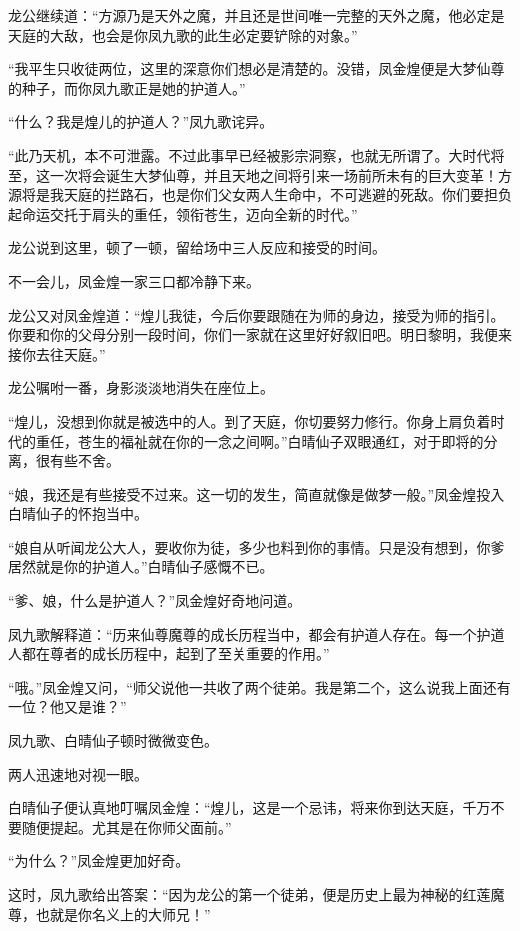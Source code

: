 \begin{this_body}
龙公继续道：“方源乃是天外之魔，并且还是世间唯一完整的天外之魔，他必定是天庭的大敌，也会是你凤九歌的此生必定要铲除的对象。”

“我平生只收徒两位，这里的深意你们想必是清楚的。没错，凤金煌便是大梦仙尊的种子，而你凤九歌正是她的护道人。”

“什么？我是煌儿的护道人？”凤九歌诧异。

“此乃天机，本不可泄露。不过此事早已经被影宗洞察，也就无所谓了。大时代将至，这一次将会诞生大梦仙尊，并且天地之间将引来一场前所未有的巨大变革！方源将是我天庭的拦路石，也是你们父女两人生命中，不可逃避的死敌。你们要担负起命运交托于肩头的重任，领衔苍生，迈向全新的时代。”

龙公说到这里，顿了一顿，留给场中三人反应和接受的时间。

不一会儿，凤金煌一家三口都冷静下来。

龙公又对凤金煌道：“煌儿我徒，今后你要跟随在为师的身边，接受为师的指引。你要和你的父母分别一段时间，你们一家就在这里好好叙旧吧。明日黎明，我便来接你去往天庭。”

龙公嘱咐一番，身影淡淡地消失在座位上。

“煌儿，没想到你就是被选中的人。到了天庭，你切要努力修行。你身上肩负着时代的重任，苍生的福祉就在你的一念之间啊。”白晴仙子双眼通红，对于即将的分离，很有些不舍。

“娘，我还是有些接受不过来。这一切的发生，简直就像是做梦一般。”凤金煌投入白晴仙子的怀抱当中。

“娘自从听闻龙公大人，要收你为徒，多少也料到你的事情。只是没有想到，你爹居然就是你的护道人。”白晴仙子感慨不已。

“爹、娘，什么是护道人？”凤金煌好奇地问道。

凤九歌解释道：“历来仙尊魔尊的成长历程当中，都会有护道人存在。每一个护道人都在尊者的成长历程中，起到了至关重要的作用。”

“哦。”凤金煌又问，“师父说他一共收了两个徒弟。我是第二个，这么说我上面还有一位？他又是谁？”

凤九歌、白晴仙子顿时微微变色。

两人迅速地对视一眼。

白晴仙子便认真地叮嘱凤金煌：“煌儿，这是一个忌讳，将来你到达天庭，千万不要随便提起。尤其是在你师父面前。”

“为什么？”凤金煌更加好奇。

这时，凤九歌给出答案：“因为龙公的第一个徒弟，便是历史上最为神秘的红莲魔尊，也就是你名义上的大师兄！”

\end{this_body}

